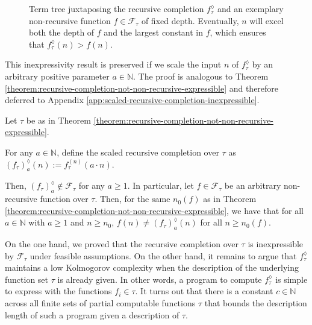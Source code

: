 \begin{figure}[h]
\begin{center}
	\end{center}
	\caption[Dominance of the recursive completion over non-recursive functions.]{Term tree juxtaposing the recursive completion $f_{\tau}^{\lozenge}$ and an exemplary non-recursive function $f\in\mathcal{F}_{\tau}$ of fixed depth. Eventually, $n$ will excel both the depth of $f$ and the largest constant in $f$, which ensures that $f_{\tau}^{\lozenge}(n)>f(n)$.}
	\label{fig:composition-tree-recursive-completion-vs-fixed-term}
\end{figure}

This inexpressivity result is preserved if we scale the input $n$ of $f_\tau^{\lozenge}$ by an arbitrary positive parameter $a\in\mathbb{N}$. 
The proof is analogous to Theorem \ref{theorem:recursive-completion-not-non-recursive-expressible} and therefore deferred to Appendix \ref{app:scaled-recursive-completion-inexpressible}.
\begin{corollary}
	\label{cor:scaled-recursive-completion-not-non-recursive-expressible-placeholder}
	Let $\tau$ be as in Theorem \ref{theorem:recursive-completion-not-non-recursive-expressible}.
	
	For any $a\in\mathbb{N}$, define the scaled recursive completion over $\tau$ as
	$\left(f_{\tau}\right)_{a}^{\lozenge}(n):=f_{\tau}^{(n)}(a\cdot n)$.
	
	Then, $\left(f_{\tau}\right)_{a}^{\lozenge}\notin \mathcal{F}_{\tau}$ for any $a \geq 1$.
	In particular, let $f\in\mathcal{F}_{\tau}$ be an arbitrary non-recursive function over $\tau$.
	Then, for the same $n_0(f)$ as in Theorem \ref{theorem:recursive-completion-not-non-recursive-expressible}, we have that for all $a\in\mathbb{N}$ with $a\geq 1$ and $n\geq n_0$, $f(n)\neq \left(f_{\tau}\right)_{a}^{\lozenge}(n)$ for all $n\geq n_0(f)$.
\end{corollary}

On the one hand, we proved that the recursive completion over $\tau$ is inexpressible by $\mathcal{F}_{\tau}$ under feasible assumptions.
On the other hand, it remains to argue that $f_\tau^{\lozenge}$ maintains a low Kolmogorov complexity when the description of the underlying function set $\tau$ is already given.
In other words, a program to compute $f_{\tau}^{\lozenge}$ is simple to express with the functions $f_i\in\tau$.
It turns out that there is a constant $c\in\mathbb{N}$ across all finite sets of partial computable functions $\tau$ that bounds the description length of such a program given a description of $\tau$.

